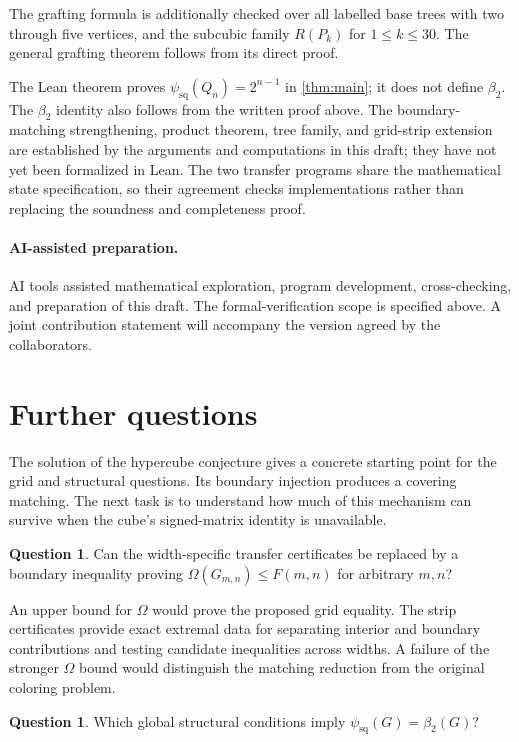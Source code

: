 \documentclass[11pt]{article}
\theoremstyle{definition}
\newtheorem{question}[theorem]{Question}
\theoremstyle{remark}
\newcommand{\psq}{\psi_{\mathrm{sq}}}
\newcommand{\bii}{\beta_2}
\newcommand{\Om}{\Omega}
\begin{document}
The grafting formula is additionally checked over all labelled base trees
with two through five vertices, and the subcubic family $R(P_k)$ for
$1\le k\le30$. The general grafting theorem follows from its direct proof.

The Lean theorem proves $\psq(Q_n)=2^{n-1}$ in \cref{thm:main}; it does not
define $\bii$. The $\bii$ identity also follows from the written proof above.
The boundary-matching strengthening,
product theorem, tree family, and grid-strip extension are established by
the arguments and computations in this draft; they have not yet been
formalized in Lean. The two transfer programs share the mathematical
state specification, so their agreement checks implementations rather
than replacing the soundness and completeness proof.

\paragraph{AI-assisted preparation.}
AI tools assisted mathematical exploration, program development,
cross-checking, and preparation of this draft. The formal-verification
scope is specified above. A joint contribution statement will accompany
the version agreed by the collaborators.

\section{Further questions}

The solution of the hypercube conjecture gives a concrete starting point
for the grid and structural questions. Its boundary injection produces
a covering matching. The next task is to understand how much of this
mechanism can survive when the cube's signed-matrix identity is unavailable.

\begin{question}
Can the width-specific transfer certificates be replaced by a boundary
inequality proving $\Om(G_{m,n})\le F(m,n)$ for arbitrary $m,n$?
\end{question}

An upper bound for $\Om$ would prove the proposed grid equality. The strip
certificates provide exact extremal data for separating interior and
boundary contributions and testing candidate inequalities across widths.
A failure of the stronger $\Om$ bound would distinguish the matching
reduction from the original coloring problem.

\begin{question}
Which global structural conditions imply $\psq(G)=\bii(G)$?
\end{question}
\end{document}
